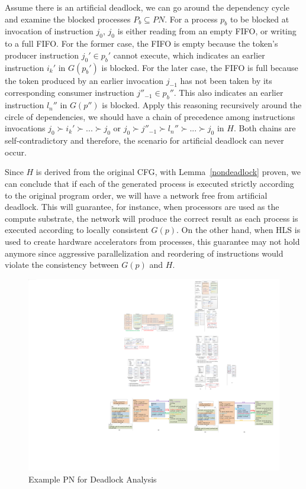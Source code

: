 \documentclass{sig-alternate}
\begin{document}
Assume there is an artificial deadlock, we can go around the dependency
cycle and examine the blocked processes $P_b \subseteq PN$. For a process $p_b$
to be blocked at invocation of instruction $j_0$, $j_0$ is either reading from an empty FIFO, or writing to a full FIFO. For the former case, the FIFO is empty because the token's producer instruction $j_0' \in p_b'$ cannot execute, which indicates an earlier instruction  $i_k'$ in $G(p_b')$ is blocked. For the later case, the FIFO is full because the token produced by an earlier invocation $j_{-1}$ has not been taken by its corresponding consumer instruction $j''_{-1} \in p_b''$. This also indicates an earlier instruction $l_n''$ in $G(p'')$ is blocked. Apply this reasoning recursively around the circle of dependencies,
we should have a chain of precedence among instructions invocations $j_0 \succ i_k' \succ ... \succ j_0$
or $j_0 \succ j''_{-1} \succ l_n'' \succ ... \succ j_0$ in $H$. %
Both chains are self-contradictory and therefore, the scenario for artificial deadlock can never occur. 

Since $H$ is derived from the original CFG, with Lemma~\ref{nondeadlock} proven, we can conclude that if each of the generated process is executed strictly according to the original program order, we will have a network free from artificial deadlock. This
will guarantee, for instance, when processors are used as the compute substrate, the network will produce the correct result as each process is executed according to locally consistent $G(p)$. On the other hand, when HLS is used to create hardware accelerators from processes, this guarantee may not
hold anymore since aggressive parallelization and reordering of instructions
would violate the consistency between $G(p)$ and $H$. 

\begin{figure}[htp]
\begin{center}
\includegraphics[width=1.0\linewidth]{fig/dlmo.pdf}
\caption{Example PN for Deadlock Analysis
\label{fig:example}}
\end{center}
\vspace{-1.5em}
\end{figure}
\end{document}
